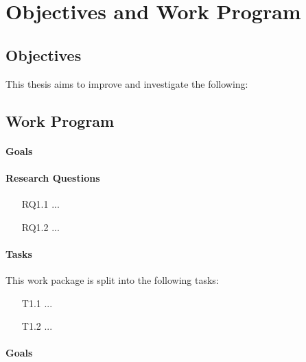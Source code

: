 
\chapter{Objectives and Work Program}

\section{Objectives}
\label{sec-objectives}

\blindtext

This thesis aims to improve and investigate the following:

\blinditemize


\section{Work Program}
\label{sec-workprogram}

\blindtext


\subsubsection{Goals}
\blindtext

\subsubsection{Research Questions}
\begin{itemize}
	\item[RQ1.1] ...
	\item[RQ1.2] ...
\end{itemize}

\subsubsection{Tasks}
This work package is split into the following tasks:
\begin{itemize}
	\item[T1.1] ...
	\item[T1.2] ...
\end{itemize}


\subsubsection{Goals}
\blindtext


